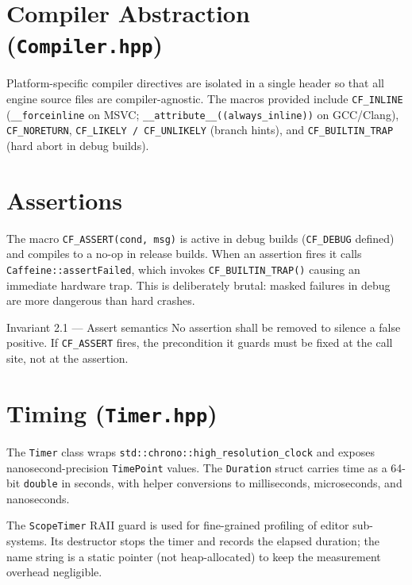 \documentclass[12pt, a4paper]{report}
\theoremstyle{definition}
\theoremstyle{remark}
\begin{document}
\section{Compiler Abstraction (\texttt{Compiler.hpp})}

Platform-specific compiler directives are isolated in a single header so
that all engine source files are compiler-agnostic. The macros provided
include \texttt{CF\_INLINE} (\texttt{\_\_forceinline} on MSVC;
\texttt{\_\_attribute\_\_((always\_inline))} on GCC/Clang),
\texttt{CF\_NORETURN}, \texttt{CF\_LIKELY / CF\_UNLIKELY} (branch hints),
and \texttt{CF\_BUILTIN\_TRAP} (hard abort in debug builds).

\section{Assertions}

The macro \texttt{CF\_ASSERT(cond, msg)} is active in debug builds
(\texttt{CF\_DEBUG} defined) and compiles to a no-op in release builds.
When an assertion fires it calls \texttt{Caffeine::assertFailed}, which
invokes \texttt{CF\_BUILTIN\_TRAP()} causing an immediate hardware trap.
This is deliberately brutal: masked failures in debug are more dangerous
than hard crashes.

\begin{specbox}{Invariant 2.1 — Assert semantics}
  No assertion shall be removed to silence a false positive.
  If \texttt{CF\_ASSERT} fires, the precondition it guards must be fixed at
  the call site, not at the assertion.
\end{specbox}

\section{Timing (\texttt{Timer.hpp})}

The \texttt{Timer} class wraps \texttt{std::chrono::high\_resolution\_clock}
and exposes nanosecond-precision \texttt{TimePoint} values. The
\texttt{Duration} struct carries time as a 64-bit \texttt{double} in seconds,
with helper conversions to milliseconds, microseconds, and nanoseconds.

The \texttt{ScopeTimer} RAII guard is used for fine-grained profiling of
editor sub-systems. Its destructor stops the timer and records the elapsed
duration; the name string is a static pointer (not heap-allocated) to keep
the measurement overhead negligible.

\end{document}
